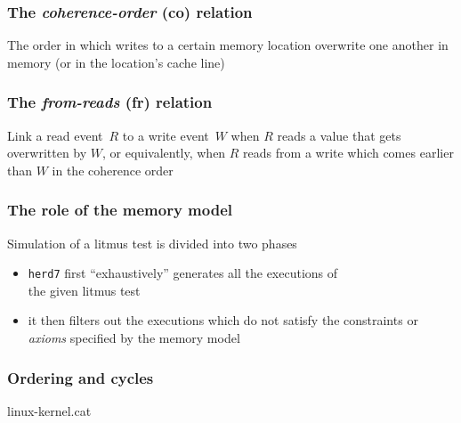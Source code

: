 \documentclass[usenames,dvipsnames]{beamer}
\begin{document}
\begin{frame}[fragile]
\frametitle{The \emph{coherence-order} (co) relation}

The order in which writes to a certain memory location overwrite
one another in memory (or in the location's cache line)

\end{frame}


\begin{frame}[fragile]
\frametitle{The \emph{from-reads} (fr) relation}

Link a read event~$R$ to a write event~$W$ when $R$ reads a value that
gets overwritten by $W$, or equivalently, when $R$ reads from a write
which comes earlier than $W$ in the coherence order

\end{frame}


\begin{frame}[fragile]
\frametitle{The role of the memory model}

Simulation of a litmus test is divided into two phases
\vspace{2mm}
\begin{itemize}
	\item \texttt{herd7} first ``exhaustively'' generates all the
	executions of \\ the given litmus test

\vspace{2mm}
	\item it then filters out the executions which do not satisfy
	the constraints or \emph{axioms} specified by the memory model
\end{itemize}

\end{frame}


\begin{frame}[fragile]
\frametitle{Ordering and cycles}

\begin{center}
linux-kernel.cat
\end{center}

\end{frame}
\end{document}
